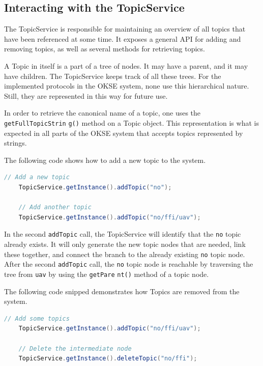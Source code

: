 \subsection{Interacting with the TopicService}
\label{subsec:components-interacting_with_the_topicservice}

The TopicService is responsible for maintaining an overview of all topics that have been referenced at some time. It exposes a general API for adding and removing topics, as well as several methods for retrieving topics.

A Topic in itself is a part of a tree of nodes. It may have a parent, and it may have children. The TopicService keeps track of all these trees. For the implemented protocols in the OKSE system, none use this hierarchical nature. Still, they are represented in this way for future use.

In order to retrieve the canonical name of a topic, one uses the \verb!getFullTopicStrin! \verb!g()! method on a Topic object. This representation is what is expected in all parts of the OKSE system that accepts topics represented by strings.

The following code shows how to add a new topic to the system.

\begin{lstlisting}[language=Java, captionpos=b, caption=Adding a new topic, frame=bt, showstringspaces=false]
    // Add a new topic
    TopicService.getInstance().addTopic("no");
    
    // Add another topic
    TopicService.getInstance().addTopic("no/ffi/uav");
\end{lstlisting}

In the second \verb!addTopic! call, the TopicService will identify that the \verb!no! topic already exists. It will only generate the new topic nodes that are needed, link these together, and connect the branch to the already existing \verb!no! topic node. After the second \verb!addTopic! call, the \verb!no! topic node is reachable by traversing the tree from \verb!uav! by using the \verb!getPare! \verb!nt()! method of a topic node.

The following code snipped demonstrates how Topics are removed from the system.

\begin{lstlisting}[language=Java, captionpos=b, caption=Deleting a topic, frame=bt, showstringspaces=false]
    // Add some topics
    TopicService.getInstance().addTopic("no/ffi/uav");
    
    // Delete the intermediate node
    TopicService.getInstance().deleteTopic("no/ffi");
\end{lstlisting}

